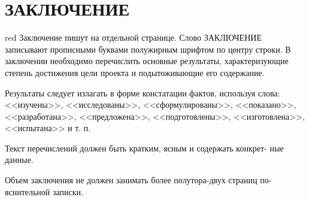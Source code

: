 \section*{ЗАКЛЮЧЕНИЕ}

\begin{color}{red}
  Заключение пишут на отдельной странице. Слово ЗАКЛЮЧЕНИЕ
  записывают прописными буквами полужирным шрифтом по центру строки.
  В заключении необходимо перечислить основные результаты, характеризующие
  степень достижения цели проекта и подытоживающие его содержание.

  Результаты следует излагать в форме констатации фактов, используя слова:
  <<изучены>>, <<исследованы>>, <<сформулированы>>, <<показано>>,
  <<разработана>>, <<предложена>>, <<подготовлены>>, <<изготовлена>>,
  <<испытана>> и т. п.

  Текст перечислений должен быть кратким, ясным и содержать конкрет-
  ные данные.

  Объем заключения не должен занимать более полутора-двух страниц по-
  яснительной записки.
\end{color}